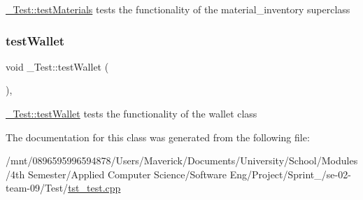\hyperlink{class__Test_ad5396e54792008660924db2e16edb614}{\+\_\+\+Test\+::test\+Materials} tests the functionality of the material\+\_\+inventory superclass 

\mbox{\label{class__Test_afbce4b6817db0c8423dd4296a18f75de}} 
\subsubsection{\texorpdfstring{test\+Wallet}{testWallet}}
{\footnotesize\ttfamily void \+\_\+\+Test\+::test\+Wallet (\begin{DoxyParamCaption}{ }\end{DoxyParamCaption})\hspace{0.3cm}{\ttfamily [private]}, {\ttfamily [slot]}}



\hyperlink{class__Test_afbce4b6817db0c8423dd4296a18f75de}{\+\_\+\+Test\+::test\+Wallet} tests the functionality of the wallet class 



The documentation for this class was generated from the following file\+:\begin{DoxyCompactItemize}
\item 
/mnt/0896595996594878/\+Users/\+Maverick/\+Documents/\+University/\+School/\+Modules/4th Semester/\+Applied Computer Science/\+Software Eng/\+Project/\+Sprint\+\_/se-\/02-\/team-\/09/\+Test/\hyperlink{tst__test_8cpp}{tst\+\_\+test.\+cpp}\end{DoxyCompactItemize}
